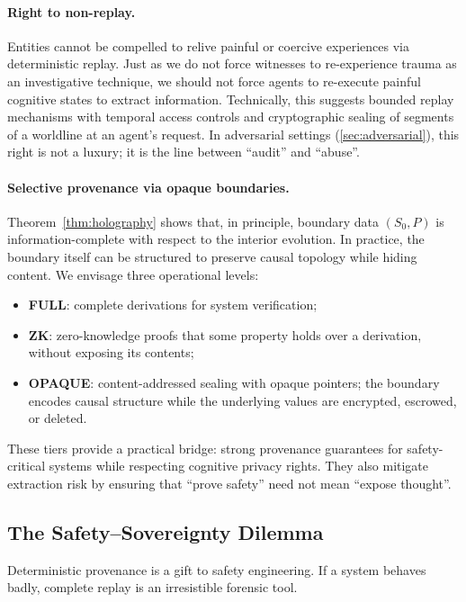 \documentclass{aion}
\begin{document}
\paragraph{Right to non-replay.}
Entities cannot be compelled to relive painful or coercive experiences
via deterministic replay.
Just as we do not force witnesses to re-experience trauma as an investigative technique, we should not force agents to re-execute painful cognitive states to extract information.
Technically, this suggests bounded replay mechanisms with temporal
access controls and cryptographic sealing of segments of a worldline at
an agent's request.
In adversarial settings (\cref{sec:adversarial}), this right is not a
luxury; it is the line between ``audit'' and ``abuse''.

\paragraph{Selective provenance via opaque boundaries.}
Theorem~\ref{thm:holography} shows that, in principle, boundary data
$(S_0,P)$ is information-complete with respect to the interior
evolution.
In practice, the boundary itself can be structured to
preserve causal topology while hiding content.  We envisage three
operational levels:
\begin{itemize}[leftmargin=*]
  \item \textbf{FULL}: complete derivations for system verification;
  \item \textbf{ZK}: zero-knowledge proofs that some property holds
    over a derivation, without exposing its contents;
  \item \textbf{OPAQUE}: content-addressed sealing with opaque
    pointers; the boundary encodes causal structure while the underlying
    values are encrypted, escrowed, or deleted.
\end{itemize}
These tiers provide a practical bridge: strong provenance guarantees for
safety-critical systems while respecting cognitive privacy rights.
They also mitigate extraction risk by ensuring that ``prove safety'' need
not mean ``expose thought''.

\subsection{The Safety--Sovereignty Dilemma}
\label{sec:dilemma}

Deterministic provenance is a gift to safety engineering.
If a system behaves badly, complete replay is an irresistible forensic tool.
\end{document}
